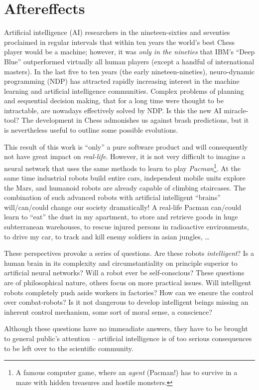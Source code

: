 \section{Aftereffects}
Artificial intelligence (AI) researchers in the nineteen-sixties and seventies proclaimed in regular intervals that within ten years the world's best Chess player would be a machine; however, it was \emph{only in the nineties} that IBM's ``Deep Blue'' outperformed virtually all human players (except a handful of international masters). In the last five to ten years (the early nineteen-nineties), neuro-dynamic programming (NDP) has attracted rapidly increasing interest in the machine learning and artificial intelligence communities. Complex problems of planning and sequential decision making, that for a long time were thought to be intractable, are nowadays effectively solved by NDP. Is this the new AI miracle-tool? The development in Chess admonishes us against brash predictions, but it is nevertheless useful to outline some possible evolutions.

This result of this work is ``only'' a pure software product and will consequently not have great impact on \emph{real-life}. However, it is not very difficult to imagine a neural network that uses the same methods to learn to play \emph{Pacman}\footnote{A famous computer game, where an \emph{agent} (Pacman!) has to survive in a maze with hidden treasures and hostile monsters.}. At the same time industrial robots build entire cars, independent mobile units explore the Mars, and humanoid robots are already capable of climbing staircases. The combination of such advanced robots with artificial intelligent ``brains'' will/\-can/\-could change our society dramatically! A real-life Pacman can/could learn to ``eat'' the dust in my apartment, to store and retrieve goods in huge subterranean warehouses, to rescue injured persons in radioactive environments, to drive my  car, to track and kill enemy soldiers in asian jungles, \ldots 

These perspectives provoke a series of questions. Are these robots \emph{intelligent}? Is a human brain in its complexity and circumstantiality on principle superior to artificial neural networks? Will a robot ever be self-conscious? These questions are of philosophical nature, others focus on more practical issues. Will intelligent robots completely push aside workers in factories? How can we ensure the control over combat-robots? Is it not dangerous to develop intelligent beings missing an inherent control mechanism, some sort of moral sense, a conscience? 

Although these questions have no immeadiate answers, they have to be brought to general public's attention -- artificial intelligence is of too serious consequences to be left over to the scientific community.





